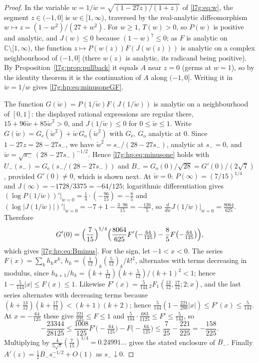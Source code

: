 \documentclass[11pt,letterpaper]{article}
\theoremstyle{remark}\newtheorem{remark}[theorem]{Remark}
\newcounter{l7gtrsavedeq}
\begin{document}
\begin{proof}
In the variable $w=1/\check w=\sqrt{(1-27z)/(1+z)}$ of \eqref{l7g:eq:w}, the
segment $z\in(-1,0]$ is $w\in[1,\infty)$, traversed by the real-analytic
diffeomorphism $w\mapsto z=(1-w^2)/(27+w^2)$. For $w\ge1$, $T(w)>0$, so
$P(w)$ is positive and analytic, and $J(w)\le0$ because $(1-w)^7\le0$; as
$F$ is analytic on $\mathbb C\setminus[1,\infty)$, the function
$z\mapsto P(w(z))F(J(w(z)))$ is analytic on a complex neighbourhood of
$(-1,0]$ (there $w(z)$ is analytic, its radicand being positive). By
Proposition~\ref{l7g:prop:pullback} it equals $A$ near $z=0$ (germs at
$w=1$), so by the identity theorem it is the continuation of $A$ along
$(-1,0]$. Writing it in $\check w=1/w$ gives \eqref{l7g:hp:eq:minusoneGF}.

The function $G(\check w)=P(1/\check w)F(J(1/\check w))$ is analytic on a neighbourhood of
$[0,1]$: the displayed rational expressions are regular there,
$15+96\check w+85\check w^2>0$, and $J(1/\check w)\le0$ for $0\le \check w\le1$. Write
$G(\check w)=G_{\mathrm e}(\check w^2)+\check w\,G_{\mathrm o}(\check w^2)$ with $G_{\mathrm e}$,
$G_{\mathrm o}$ analytic at $0$. Since $1-27z=28-27s_-$, we have
$\check w^2=s_-/(28-27s_-)$, analytic at $s_-=0$, and
$\check w=\sqrt{s_-}\,(28-27s_-)^{-1/2}$. Hence \eqref{l7g:hp:eq:minusone} holds
with $U_-(s_-)=G_{\mathrm e}(s_-/(28-27s_-))$ and
$B_-=G_{\mathrm o}(0)/\sqrt{28}=G'(0)/(2\sqrt7)$, provided $G'(0)\ne0$,
which is shown next. At $\check w=0$: $P(\infty)=(7/15)^{1/4}$ and
$J(\infty)=-1728/3375=-64/125$; logarithmic differentiation gives
$(\log P(1/\check w))'|_{\check w=0}=\frac14\cdot(-\frac{96}{15})=-\frac85$ and
$(\log|J(1/\check w)|)'|_{\check w=0}=-7+1-\frac{3\cdot96}{15}=-\frac{126}5$, so
$\frac{d}{d\check w}J(1/\check w)|_{\check w=0}=\frac{8064}{625}$. Therefore
\[
 G'(0)=\Bigl(\frac7{15}\Bigr)^{1/4}\Bigl(\frac{8064}{625}F'\bigl(-\tfrac{64}{125}\bigr)
 -\frac85F\bigl(-\tfrac{64}{125}\bigr)\Bigr),
\]
which gives \eqref{l7g:hp:eq:Bminus}. For the sign, let $-1<x<0$. The
series $F(x)=\sum_kh_kx^k$, $h_k=(\frac1{12})_k(\frac5{12})_k/k!^2$,
alternates with terms decreasing in modulus, since
$h_{k+1}/h_k=(k+\frac1{12})(k+\frac5{12})/(k+1)^2<1$; hence
$1-\frac5{144}|x|\le F(x)\le1$. Likewise
$F'(x)=\frac5{144}\,{}_2F_1(\frac{13}{12},\frac{17}{12};2;x)$, and the last series alternates
with decreasing terms because
$(k+\frac{13}{12})(k+\frac{17}{12})<(k+1)(k+2)$; hence
$\frac5{144}(1-\frac{221}{288}|x|)\le F'(x)\le\frac5{144}$. At
$x=-\frac{64}{125}$ these give $\frac{221}{225}\le F\le1$ and
$\frac5{144}\cdot\frac{683}{1125}\le F'\le\frac5{144}$, so
\[
 -\frac{23344}{28125}\le\frac{1008}{125}F'\bigl(-\tfrac{64}{125}\bigr)-F\bigl(-\tfrac{64}{125}\bigr)
 \le\frac7{25}-\frac{221}{225}=-\frac{158}{225}.
\]
Multiplying by $\frac4{5\sqrt7}(\frac7{15})^{1/4}=0.24991\ldots$ gives the
stated enclosure of $B_-$. Finally $A'(z)=\frac12B_-s_-^{-1/2}+O(1)$ as
$s_-\downarrow0$.
\end{proof}
\end{document}
